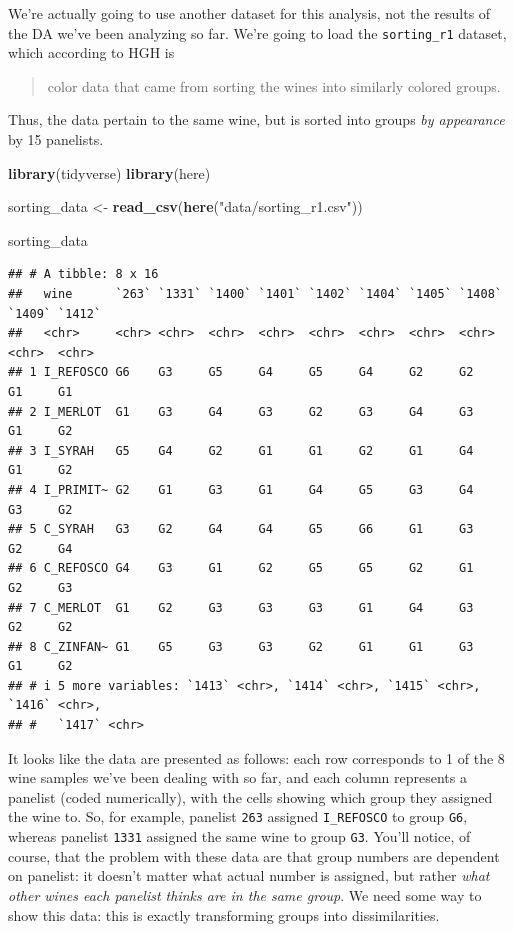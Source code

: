 \documentclass[
]{book}
\newenvironment{Shaded}{\begin{snugshade}}{\end{snugshade}}
\newcommand{\FunctionTok}[1]{\textcolor[rgb]{0.13,0.29,0.53}{\textbf{#1}}}
\newcommand{\NormalTok}[1]{#1}
\newcommand{\OtherTok}[1]{\textcolor[rgb]{0.56,0.35,0.01}{#1}}
\newcommand{\StringTok}[1]{\textcolor[rgb]{0.31,0.60,0.02}{#1}}
\begin{document}
We're actually going to use another dataset for this analysis, not the results of the DA we've been analyzing so far. We're going to load the \texttt{sorting\_r1} dataset, which according to HGH is

\begin{quote}
color data that came from sorting the wines into similarly colored groups.
\end{quote}

Thus, the data pertain to the same wine, but is sorted into groups \emph{by appearance} by 15 panelists.

\begin{Shaded}
\begin{Highlighting}[]
\FunctionTok{library}\NormalTok{(tidyverse)}
\FunctionTok{library}\NormalTok{(here)}

\NormalTok{sorting\_data }\OtherTok{\textless{}{-}} \FunctionTok{read\_csv}\NormalTok{(}\FunctionTok{here}\NormalTok{(}\StringTok{"data/sorting\_r1.csv"}\NormalTok{))}

\NormalTok{sorting\_data}
\end{Highlighting}
\end{Shaded}

\begin{verbatim}
## # A tibble: 8 x 16
##   wine      `263` `1331` `1400` `1401` `1402` `1404` `1405` `1408` `1409` `1412`
##   <chr>     <chr> <chr>  <chr>  <chr>  <chr>  <chr>  <chr>  <chr>  <chr>  <chr> 
## 1 I_REFOSCO G6    G3     G5     G4     G5     G4     G2     G2     G1     G1    
## 2 I_MERLOT  G1    G3     G4     G3     G2     G3     G4     G3     G1     G2    
## 3 I_SYRAH   G5    G4     G2     G1     G1     G2     G1     G4     G1     G2    
## 4 I_PRIMIT~ G2    G1     G3     G1     G4     G5     G3     G4     G3     G2    
## 5 C_SYRAH   G3    G2     G4     G4     G5     G6     G1     G3     G2     G4    
## 6 C_REFOSCO G4    G3     G1     G2     G5     G5     G2     G1     G2     G3    
## 7 C_MERLOT  G1    G2     G3     G3     G3     G1     G4     G3     G2     G2    
## 8 C_ZINFAN~ G1    G5     G3     G3     G2     G1     G1     G3     G1     G2    
## # i 5 more variables: `1413` <chr>, `1414` <chr>, `1415` <chr>, `1416` <chr>,
## #   `1417` <chr>
\end{verbatim}

It looks like the data are presented as follows: each row corresponds to 1 of the 8 wine samples we've been dealing with so far, and each column represents a panelist (coded numerically), with the cells showing which group they assigned the wine to. So, for example, panelist \texttt{263} assigned \texttt{I\_REFOSCO} to group \texttt{G6}, whereas panelist \texttt{1331} assigned the same wine to group \texttt{G3}. You'll notice, of course, that the problem with these data are that group numbers are dependent on panelist: it doesn't matter what actual number is assigned, but rather \emph{what other wines each panelist thinks are in the same group}. We need some way to show this data: this is exactly transforming groups into dissimilarities.
\end{document}
